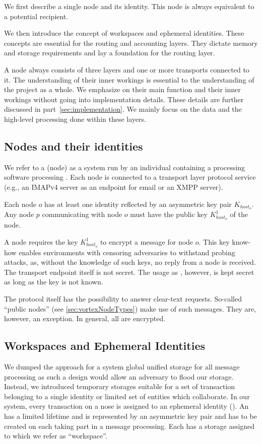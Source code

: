 We first describe a single node and its identity. This node is always equivalent to a potential recipient. 

We then introduce the concept of workspaces and ephemeral identities. These concepts are essential for the routing and accounting layers. They dictate memory and storage requirements and lay a foundation for the routing layer.

A node always consists of three layers and one or more transports connected to it. The understanding of their inner workings is essential to the understanding of the project as a whole. We emphasize on their main function and their inner workings without going into implementation details. These details are further discussed in part~\ref{sec:implementation}. We mainly focus on the data and the high-level processing done within these layers.

\subsection{Nodes and their identities}
We refer to a \VortexNode{} (node) as a system run by an individual containing a processing software processing \VortexMessages. Each node is connected to a transport layer protocol service (e.g., an IMAPv4 server as an endpoint for email or an XMPP server). 

Each node $o$ has at least one identity reflected by an asymmetric key pair $K_{host_o}$. Any node $p$ communicating with node $o$ must have the public key  $K^1_{host_o}$ of the node.

A node requires the key $K^1_{host_o}$ to encrypt a message for node $o$. This key know-how enables environments with censoring adversaries to withstand probing attacks, as, without the knowledge of such keys, no reply from a node is received. The transport endpoint itself is not secret. The usage as \VortexNode, however, is kept secret as long as the key is not known.

The protocol itself has the possibility to answer clear-text requests. So-called ``public nodes'' (see \ref{sec:vortexNodeTypes}) make use of such messages. They are, however, an exception. In general, all \VortexMessages{} are encrypted.

\subsection{Workspaces and Ephemeral Identities}
We dumped the approach for a system global unified storage for all message processing as such a design would allow an adversary to flood our storage. Instead, we introduced temporary storages suitable for a set of transaction belonging to a single identity or limited set of entities which collaborate. In our system, every transaction on a nose is assigned to an ephemeral identity (). An  has a limited lifetime and is represented by an asymmetric key pair and has to be created on each \VortexNode{} taking part in a message processing. Each  has a storage assigned to which we refer as ``workspace''.

